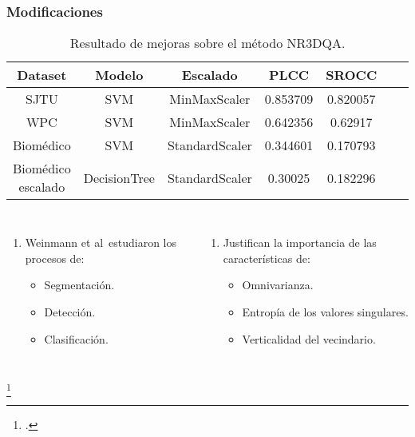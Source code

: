\begin{frame}
  \frametitle{Modificaciones}
  \vspace{-.7cm}
  \begin{table}[htp]
    \small
    \begin{center}
    \caption[Resultado de mejoras sobre el método NR3DQA.]{Resultado de mejoras sobre el método NR3DQA.}
      \begin{tabular}[c]{|c|c|c|c|c|c|c|}
        \hline
        \rowcolor[HTML]{FFC702}
        \textbf{Dataset} & \textbf{Modelo} & \textbf{Escalado} & \textbf{PLCC} & \textbf{SROCC} \\ 
        \hline
        SJTU & SVM & MinMaxScaler & 0.853709 & 0.820057 \\ 
        \hline 
        WPC & SVM & MinMaxScaler & 0.642356 & 0.62917 \\
        \hline 
        Biomédico & SVM & StandardScaler & 0.344601 &  0.170793 \\
        \hline
        Biomédico escalado & DecisionTree & StandardScaler & 0.30025  & 0.182296 \\
        \hline
      \end{tabular}
    \end{center}
    \label{tab:ImprovNR3DQA}
  \end{table}
  \begin{columns}
    \begin{enumerate}
      \item Weinmann et al\footnotemark ~estudiaron los procesos de: 
        \begin{itemize}
          \item Segmentación.
          \item Detección.
          \item Clasificación.
        \end{itemize}
    \end{enumerate}
    \begin{enumerate}
      \item Justifican la importancia de las características de:  
        \begin{itemize}
          \item Omnivarianza.
          \item Entropía de los valores singulares.
          \item Verticalidad del vecindario.
        \end{itemize}
    \end{enumerate}
\end{columns}
\footcitetext{3DNSSMetrics}
\end{frame}


